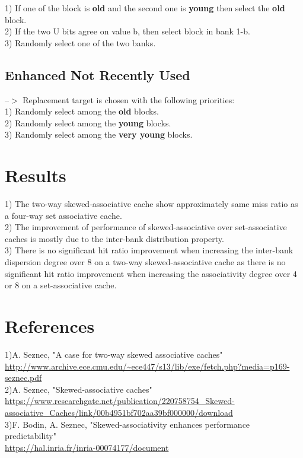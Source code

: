 \documentclass{article}
\begin{document}
\begin{large}
1) If one of the block is \textbf{old} and the second one is \textbf{young} then select the \textbf{old} block.\\

2) If the two U bits agree on value b, then select block in bank 1-b.\\

3) Randomly select one of the two banks.
\newpage
\subsection{Enhanced Not Recently Used} --$>$ 
Replacement target is chosen with the following priorities:\\

1) Randomly select among the \textbf{old} blocks.\\

2) Randomly select among the \textbf{young} blocks.\\

3) Randomly select among the \textbf{very young} blocks.

\section{Results}
1) The two-way skewed-associative cache show approximately same miss ratio as a four-way set associative cache.\\

2) The improvement of performance of skewed-associative over set-associative caches is mostly due to the inter-bank distribution property.\\

3) There is no significant hit ratio improvement when increasing the inter-bank dispersion degree over 8 on a two-way skewed-associative cache as there is no significant hit ratio improvement when increasing the associativity degree over 4 or 8 on a set-associative cache.\\

\section{References}

1)A. Seznec, "A case for two-way skewed associative caches"\\
\url{http://www.archive.ece.cmu.edu/~ece447/s13/lib/exe/fetch.php?media=p169-seznec.pdf}\\

2)A. Seznec, "Skewed-associative caches"\\
\url{https://www.researchgate.net/publication/220758754_Skewed-associative_Caches/link/00b4951bf702aa39bf000000/download}\\

3)F. Bodin, A. Seznec, "Skewed-associativity enhances performance \\predictability"\\
\url{https://hal.inria.fr/inria-00074177/document}
\end{large}
\end{document}
